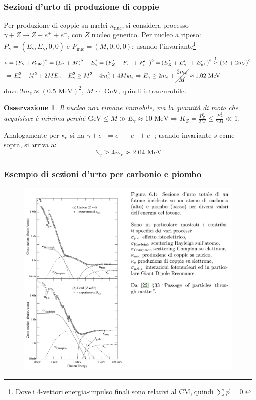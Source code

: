 \documentclass[10pt, a4paper]{scrartcl}
\numberwithin{equation}{subsection}
\theoremstyle{style1}
\newtheorem{osservazione}{Osservazione}[section]
\begin{document}
\subsubsection{Sezioni d'urto di produzione di coppie}
Per produzione di coppie su nuclei $\kappa _\text{nuc}$, si considera processo $\gamma + Z \to Z + e^+ + e^-$, con $Z$ nucleo generico. Per nucleo a riposo: $P_\gamma = (E_\gamma, E_\gamma, 0,0)$ e $P_\text{nuc} = (M,0,0,0)$; usando l'invariante\footnote{Dove i 4-vettori energia-impulso finali sono relativi al CM, quindi $\sum_{}^{} \vec{p} = 0$.}
\[
	\begin{split}
		&s = (P_\gamma + P_\text{nuc})^2 = (E_\gamma + M )^2 - E^2 _\gamma = (P'_Z + P'_{e^-}  + P'_{e^+} )^2 = (E'_Z + E'_{e^-} + E'_{e^+})^2 \stackrel{!}{\ge } (M+2m_e)^2\\
		&\Rightarrow  E^2_\gamma + M^2 +2ME_\gamma - E^2 _\gamma \ge M^2 + 4m_e^2 + 4 Mm_e \Rightarrow E_\gamma \ge  2m_e + \cancel{\frac{2m_e}{M}} \approx 1.02 \text{ MeV}
	\end{split}
\] 
dove $2m_e \approx (0.5 \text{ MeV})^2, \ M \sim \text{ GeV}$, quindi \`e trascurabile.
\begin{osservazione}
	Il nucleo non rimane immobile, ma la quantit\`a di moto che acquisisce \`e minima perch\'e $\text{GeV} \le  M \gg E_\gamma \approx 10 \text{ MeV}\Rightarrow K_Z = \frac{P_Z^2}{2M} \le \frac{E_\gamma^2}{2M}\ll 1$.
\end{osservazione}
\noindent Analogamente per $\kappa _e$ si ha $\gamma + e^- = e^- + e^+ + e^-$; usando invariante $s$ come sopra, si arriva a:
\begin{equation*}
	E_\gamma \ge 4m_e \approx 2.04 \text{ MeV}
\end{equation*}
\subsubsection{Esempio di sezioni d'urto per carbonio e piombo}
\begin{figure}
	\centering
	\includegraphics[width=\columnwidth]{C-Pb.png}
\end{figure}
\end{document}

